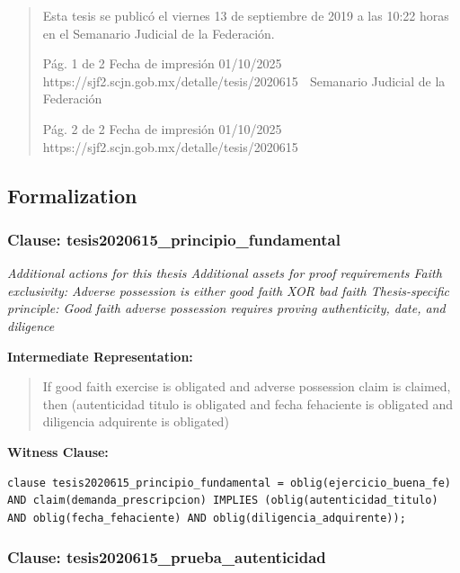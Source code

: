 \documentclass[11pt,a4paper]{article}
\begin{document}
\begin{quote}
Esta tesis se publicó el viernes 13 de septiembre de 2019 a las 10:22 horas en el Semanario
Judicial de la Federación.




                                             Pág. 1 de 2             Fecha de impresión 01/10/2025
 https://sjf2.scjn.gob.mx/detalle/tesis/2020615
                                                 Semanario Judicial de la Federación




                                            Pág. 2 de 2       Fecha de impresión 01/10/2025
https://sjf2.scjn.gob.mx/detalle/tesis/2020615

\end{quote}

\subsection{Formalization}

\subsubsection{Clause: tesis2020615\_principio\_fundamental}

\textit{Additional actions for this thesis Additional assets for proof requirements Faith exclusivity: Adverse possession is either good faith XOR bad faith Thesis-specific principle: Good faith adverse possession requires proving authenticity, date, and diligence}

\textbf{Intermediate Representation:}

\begin{quote}
If good faith exercise is obligated and adverse possession claim is claimed, then (autenticidad titulo is obligated and fecha fehaciente is obligated and diligencia adquirente is obligated)
\end{quote}

\textbf{Witness Clause:}

\begin{lstlisting}[style=witnessstyle, language=Witness]
clause tesis2020615_principio_fundamental = oblig(ejercicio_buena_fe) AND claim(demanda_prescripcion) IMPLIES (oblig(autenticidad_titulo) AND oblig(fecha_fehaciente) AND oblig(diligencia_adquirente));
\end{lstlisting}

\subsubsection{Clause: tesis2020615\_prueba\_autenticidad}
\end{document}
